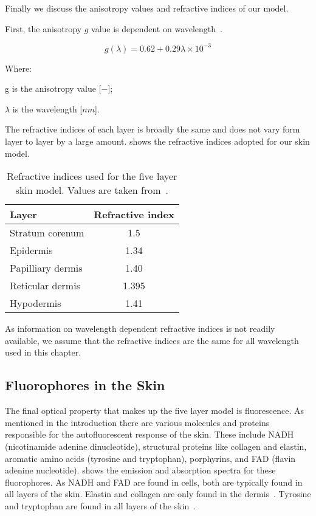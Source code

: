 Finally we discuss the anisotropy values and refractive indices of our model.

First, the anisotropy $g$ value is dependent on wavelength~\cite{louisethesis,van1989skin}.

\begin{equation}
g(\lambda)=0.62+0.29\lambda\times10^{-3}
\end{equation}

\noindent Where:

\indent g is the anisotropy value [$-$];

\indent $\lambda$ is the wavelength [$nm$].

\medskip

The refractive indices of each layer is broadly the same and does not vary form layer to layer by a large amount.
 shows the refractive indices adopted for our skin model.

\begin{table}[!htpb]
  \centering

  \begin{tabular}{l|c}
  \hline
  Layer & Refractive index \\
  \hline
    Stratum corenum & 1.5 \\
    Epidermis &  1.34\\
    Papilliary dermis & 1.40 \\
    Reticular dermis &  1.395\\
    Hypodermis &  1.41\\

  \hline
  \end{tabular}
    \caption{Refractive indices used for the five layer skin model. Values are taken from~\cite{meglinski2002quantitative}.}
  \label{tab:refindex}
\end{table}

As information on wavelength dependent refractive indices is not readily available, we assume that the refractive indices are the same for all wavelength used in this chapter.

\subsection*{Fluorophores in the Skin}

The final optical property that makes up the five layer model is fluorescence.
As mentioned in the introduction there are various molecules and proteins responsible for the autofluorescent response of the skin.
These include NADH (nicotinamide adenine dinucleotide), structural proteins like collagen and elastin, aromatic amino acids (tyrosine and tryptophan), porphyrins, and FAD (flavin adenine nucleotide).
 shows the emission and absorption spectra for these fluorophores.
As NADH and FAD are found in cells, both are typically found in all layers of the skin.
Elastin and collagen are only found in the dermis~\cite{gillies2000fluorescence}.
Tyrosine and tryptophan are found in all layers of the skin~\cite{gillies2000fluorescence}.

